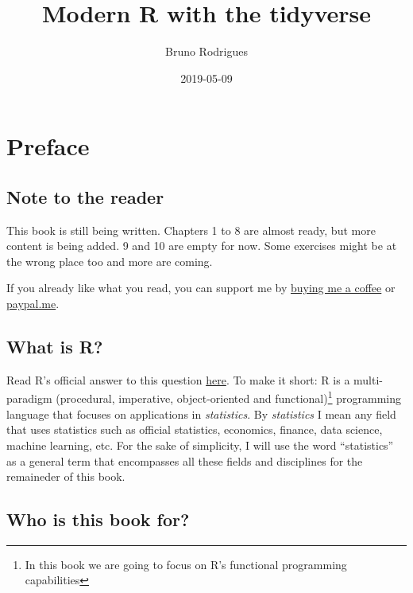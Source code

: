 \documentclass[]{gitbook}
\title{Modern R with the tidyverse}
\author{Bruno Rodrigues}
\date{2019-05-09}
\let\rmarkdownfootnote\footnote%
\def\footnote{\protect\rmarkdownfootnote}
\begin{document}
\maketitle

{
\setcounter{tocdepth}{2}
\tableofcontents
}
\hypertarget{preface}{%
\section*{Preface}\label{preface}}

\hypertarget{note-to-the-reader}{%
\subsection*{Note to the reader}\label{note-to-the-reader}}

This book is still being written. Chapters 1 to 8 are almost ready, but more content is being added.
9 and 10 are empty for now. Some exercises might be at the wrong place too and more are coming.

If you already like what you read, you can support
me by \href{https://www.buymeacoffee.com/brodriguesco}{buying me a coffee}
or \href{https://www.paypal.me/brodriguesco}{paypal.me}.

\hypertarget{what-is-r}{%
\subsection*{What is R?}\label{what-is-r}}

Read R's official answer to this question
\href{https://cran.r-project.org/doc/FAQ/R-FAQ.html\#What-is-R_003f}{here}. To make it short: R is a
multi-paradigm (procedural, imperative, object-oriented and functional)\footnote{In this book we are going
  to focus on R's functional programming capabilities} programming language that
focuses on applications in \emph{statistics}. By \emph{statistics} I mean any field that uses statistics such
as official statistics, economics, finance, data science, machine learning, etc. For the sake of
simplicity, I will use the word ``statistics'' as a general term that encompasses all these fields and
disciplines for the remaineder of this book.

\hypertarget{who-is-this-book-for}{%
\subsection*{Who is this book for?}\label{who-is-this-book-for}}
\end{document}
